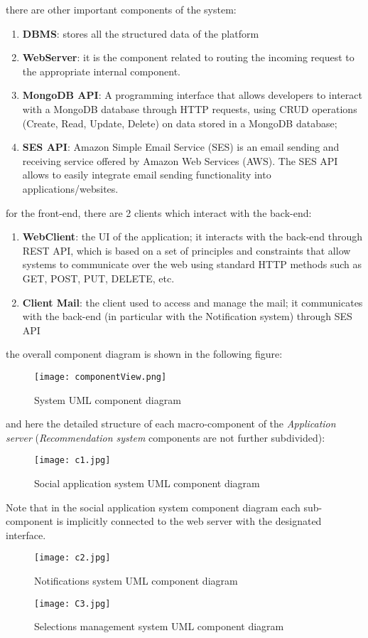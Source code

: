 			there are other important components of the system:
			\begin{enumerate}
				\item \textbf{DBMS}: stores all the structured data of the platform
				\item \textbf {WebServer}: it is the component related to routing the incoming request to the appropriate internal component.
				\item \textbf{MongoDB API}: A programming interface that allows developers to interact with a MongoDB database through HTTP requests, using CRUD operations (Create, Read, Update, Delete) on data stored in a MongoDB database;
				\item \textbf{SES API}: Amazon Simple Email Service (SES) is an email sending and receiving service offered by Amazon Web Services (AWS). The SES API allows to easily integrate email sending functionality into applications/websites.
			
			\end{enumerate}
			
			for the front-end, there are 2 clients which interact with the back-end:
			\begin{enumerate}
				\item \textbf{WebClient}: the UI of the application; it interacts with the back-end through REST API, which is based on a set of principles and constraints that allow systems to communicate over the web using standard HTTP methods such as GET, POST, PUT, DELETE, etc.
				\item \textbf{Client Mail}: the client used to access and manage the mail; it communicates with the back-end (in particular with the Notification system) through SES API
			\end{enumerate}
			
			the overall component diagram is shown in the following figure:
			\begin{figure}[H]
				\centering
				\caption{System UML component diagram}
				\texttt{[image: componentView.png]}
			\end{figure}
			and here the detailed structure of each macro-component of the \emph{Application server} (\emph{Recommendation system} components are not further subdivided):
			\begin{figure}[H]
				\centering
				\caption{Social application system UML component diagram}
				\texttt{[image: c1.jpg]}
			\end{figure}
			Note that in the social application system component diagram each sub-component is implicitly connected to the web server with the designated interface.
			\begin{figure}[H]
				\centering
				\caption{Notifications system UML component diagram}
				\texttt{[image: c2.jpg]}
			\end{figure}
			\begin{figure}[H]
				\centering
				\caption{Selections management system UML component diagram}
				\texttt{[image: C3.jpg]}
			\end{figure}
